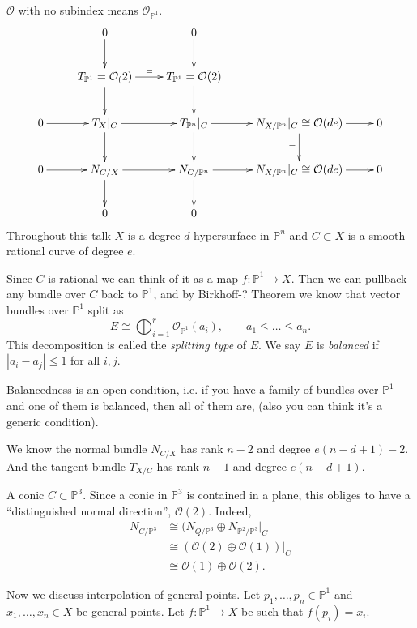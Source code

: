 \medskip\noindent

$\mathcal{O}$ with no subindex means
$\mathcal{O}_{\mathbb{P}^1}$.
$$
\xymatrix{
&0\ar[d]&0\ar[d]\\
&T_{\mathbb{P}^1}=\mathcal{O}_(2)\ar[d]\ar[r]
^=
&T_{\mathbb{P}^1}=\mathcal{O}(2)\ar[d]\\
0\ar[r]&T_{X}|_{C}\ar[d]\ar[r]&T_{\mathbb{P}
^n}|_{C}\ar[d]\ar[r]&
N_{X/\mathbb{P}^n}|_{C}\cong
\mathcal{O}(de)\ar[d]_=\ar[r]&0\\
0\ar[r]&
N_{C/X}\ar[d]\ar[r]&N_{C/\mathbb{P}^n}\ar[d]
\ar[r]&
N_{X/\mathbb{P}^n}|_{C}\cong
\mathcal{O}(de)\ar[r]&0\\
&0&0
}
$$
Throughout this talk
$X$ is a degree $d$ hypersurface in
$\mathbb{P}^n$
and $C \subset X$ is a smooth rational curve
of degree $e$.

Since $C$ is rational we can think of it
as a map $f:\mathbb{P}^1 \to X$.
Then we can pullback any bundle over $C$
back to $\mathbb{P}^1$,
and by Birkhoff-? Theorem
we know that vector bundles over
$\mathbb{P}^1$
split as
$$
E\cong \bigoplus_{i=1}^r
\mathcal{O}_{\mathbb{P}^1}(a_i),
\qquad a_1\leq \ldots \leq a_n.
$$
This decomposition is called the
{\it splitting type} of $E$.
We say $E$ is {\it balanced} if
$|a_i-a_j|\leq 1$ for all $i,j$.

Balancedness is an open condition,
i.e. if you have a family of bundles over
$\mathbb{P}^1$
and one of them is balanced, then all of them
are,
(also you can think it's a generic
condition).

We know the normal bundle $N_{C/X}$ has rank
$n-2$
and degree  $e(n-d+1)-2$.
And the tangent bundle $T_{X/C}$
has rank $n-1$ and degree $e(n-d+1)$.

\begin{example}
\label{example-conic}
A conic $C \subset \mathbb{P}^3$.
Since a conic in $\mathbb{P}^3$ is contained
in a plane,
this obliges to have a ``distinguished normal
direction'',
$\mathcal{O}(2)$. Indeed,
$$
\begin{aligned}
N_{C/\mathbb{P}^3}&\cong(N_{Q/\mathbb{P}^3}
\oplus
N_{\mathbb{P}^2/\mathbb{P}^3}|_{C}\\
&\cong(\mathcal{O}(2) \oplus
\mathcal{O}(1))|_{C}\\
&\cong\mathcal{O}(1)\oplus \mathcal{O}(2).
\end{aligned}
$$
\end{example}

\medskip\noindent
Now we discuss interpolation of general
points.
Let $p_1,\ldots,p_n \in \mathbb{P}^1$
and $x_1,\ldots, x_n \in X$
be general points.
Let $f:\mathbb{P}^1 \to X$ be such that
$f(p_i)=x_i$.

